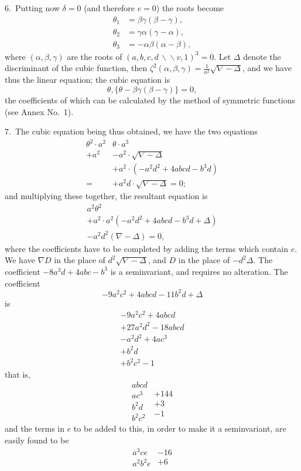 \documentclass[11pt,a4paper]{book}
\begin{document}
6.\ Putting now $\delta=0$ (and therefore $e=0$) the roots become
\begin{align*}
\theta_1 &= \beta\gamma(\beta-\gamma),\\
\theta_2 &= \gamma\alpha(\gamma-\alpha),\\
\theta_3 &= -\alpha\beta(\alpha-\beta),
\end{align*}
where $(\alpha,\beta,\gamma)$ are the roots of $(a,b,c,d\,\backslash\!\!\backslash v,1)^3=0$. Let $\Delta$ denote the discriminant of the cubic function, then $\zeta^2(\alpha,\beta,\gamma)=\frac{1}{a^2}\sqrt{\nabla-\Delta}$, and we have thus the linear equation; the cubic equation is
\[
\theta,\{\theta-\beta\gamma(\beta-\gamma)\}=0,
\]
the coefficients of which can be calculated by the method of symmetric functions (see Annex No.~1).

\newpage
\setcounter{page}{302}

7.\ The cubic equation being thus obtained, we have the two equations
\[
\begin{array}{cc}
\theta^2\cdot a^2 & \theta\cdot a^3\\
+ a^2 & -a^2\cdot\sqrt{\nabla-\Delta}\\
& +a^2\cdot(-a^2d^2+4abcd-b^3d)\\
=& +a^2d\cdot\sqrt{\nabla-\Delta} = 0;
\end{array}
\]
and multiplying these together, the resultant equation is
\[
\begin{array}{c}
a^2\theta^2\\
+a^2\cdot a^2(-a^2d^2+4abcd-b^3d+\Delta)\\
-a^2d^2(\nabla-\Delta)=0,
\end{array}
\]
where the coefficients have to be completed by adding the terms which contain $e$. We have $\nabla D$ in the place of $d^2\sqrt{\nabla-\Delta}$, and $D$ in the place of $-d^2\Delta$. The coefficient $-8a^3d+4abc-b^3$ is a seminvariant, and requires no alteration. The coefficient
\[
-9a^2c^2+4abcd-11b^2d+\Delta
\]
is
\[
\begin{array}{r}
-9a^2c^2+4abcd\\
+27a^2d^2-18abcd\\
\hline
-a^2d^2+4ac^3\\
+b^2d\\
+b^2c^2-1
\end{array}
\]
that is,
\[
\begin{array}{c}
abcd\\
ac^3\\
b^2d\\
b^2c^2
\end{array}
\begin{array}{r}
\\
+144\\
+3\\
-1
\end{array}
\]
and the terms in $e$ to be added to this, in order to make it a seminvariant, are easily found to be
\[
\begin{array}{c}
a^3ce\\
a^2b^2e
\end{array}
\begin{array}{r}
-16\\
+6
\end{array}
\]
\end{document}

